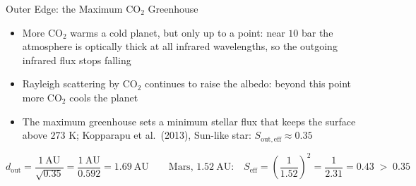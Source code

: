 \documentclass[aspectratio=169, 11pt]{beamer}
\begin{document}
\begin{frame}{Outer Edge: the Maximum CO$_2$ Greenhouse}
  \small
  \begin{itemize}\setlength\itemsep{3pt}
    \item More CO$_2$ warms a cold planet, but only up to a point: near $10$ bar the atmosphere is optically thick at all infrared wavelengths, so the outgoing infrared flux stops falling
    \item Rayleigh scattering by CO$_2$ continues to raise the albedo: beyond this point more CO$_2$ cools the planet
    \item The maximum greenhouse sets a minimum stellar flux that keeps the surface above $273$ K; Kopparapu et al.\ (2013), Sun-like star: $S_{\mathrm{out,eff}} \approx 0.35$
  \end{itemize}
  \[
    d_{\mathrm{out}} = \frac{1\ \mathrm{AU}}{\sqrt{0.35}} = \frac{1\ \mathrm{AU}}{0.592} = 1.69\ \mathrm{AU}
    \qquad
    \text{Mars, } 1.52\ \mathrm{AU}\text{:}\quad
    S_{\mathrm{eff}} = \left(\frac{1}{1.52}\right)^2 = \frac{1}{2.31} = 0.43 \;>\; 0.35
  \]
\end{frame}
\end{document}
